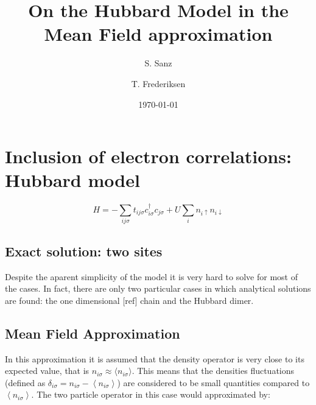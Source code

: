 \documentclass[amsmath,%
amssymb,prb,superscriptaddress]{revtex4}
\begin{document}
\title{On the Hubbard Model in the Mean Field approximation}

\author{S. Sanz}

\author{T. Frederiksen}

\date{\today}



\maketitle 


\section{Inclusion of electron correlations: Hubbard model}

\begin{equation}\label{eq:Hubbard_Hamiltonian}
H = -\sum_{ij\sigma}t_{ij\sigma}c^{\dagger}_{i\sigma}c_{j\sigma} + U\sum_{i}n_{i\uparrow}n_{i\downarrow}
\end{equation}

\subsection{Exact solution: two sites}
Despite the aparent simplicity of the model it is very hard to solve for most of the cases. In fact, there are only two particular cases in which analytical solutions are found: the one dimensional [ref] chain and the Hubbard dimer.
 


\subsection{Mean Field Approximation}

In this approximation it is assumed that the density operator is very close to its expected value, that is $n_{i\sigma} \approx \langle n_{i\sigma}\rangle$. This means that the densities fluctuations (defined as $\delta_{i\sigma} =n_{i\sigma} - \left\langle n_{i\sigma}\right\rangle$) are considered to be small quantities compared to $\left\langle n_{i\sigma}\right\rangle$. The two particle operator in this case would approximated by:
\end{document}
